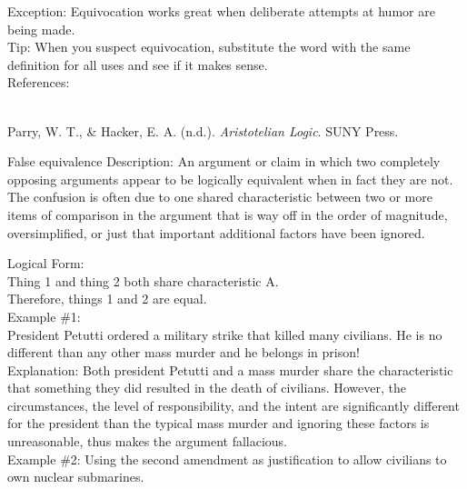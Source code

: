\documentclass[a4paper,12pt,single,pdftex]{scrartcl}
\begin{document}
{    
      Exception: Equivocation works great when deliberate attempts at humor are being made.
    \\

    
      Tip: When you suspect equivocation, substitute the word with the same definition for all uses and see if it makes sense.
    \\

    References:

    
      
        
      \\

      
        
          Parry, W. T., \& Hacker, E. A. (n.d.). {\it Aristotelian Logic}. SUNY Press.
        
      
    
  }


False equivalence
    Description: An argument or claim in which two completely opposing arguments appear to be logically equivalent when in fact they are not. The confusion is often due to one shared characteristic between two or more items of comparison in the argument that is way off in the order of magnitude, oversimplified, or just that important additional factors have been ignored.

    
      Logical Form:
    \\

    
      Thing 1 and thing 2 both share characteristic A.
    \\

    
      Therefore, things 1 and 2 are equal.
    \\

    
      Example \#1:
    \\

    
      President Petutti ordered a military strike that killed many civilians. He is no different than any other mass murder and he belongs in prison!
    \\

    
      Explanation: Both president Petutti and a mass murder share the characteristic that something they did resulted in the death of civilians. However, the circumstances, the level of responsibility, and the intent are significantly different for the president than the typical mass murder and ignoring these factors is unreasonable, thus makes the argument fallacious.
    \\

    
      Example \#2: Using the second amendment as justification to allow civilians to own nuclear submarines.
    \\
\end{document}
